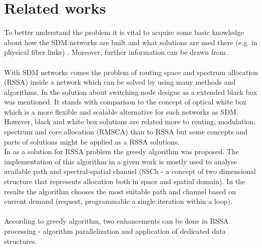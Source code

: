 \documentclass[conference]{IEEEtran}
\begin{document}
\section{Related works}
To better understand the problem it is vital to acquire some basic knowledge about how the SDM networks are built and what solutions are used there (e.g. in physical fiber links) \cite{sdm-intro}.
Moreover, further information can be drawn from \cite{rssa2}.
\\ \\
With SDM networks comes the problem of routing space and spectrum allocation (RSSA) inside a network which can be solved by using many methods and algorithms. In \cite{wb-box} the solution about  switching node designs as a extended black box was mentioned. It stands with comparison to the concept of optical white box which is a more flexible and scalable alternative for such networks as SDM. However, black and white box solutions are related more to routing, modulation, spectrum and core allocation (RMSCA) than to RSSA but some concepts and parts of solutions might be applied as a RSSA solutions.
\\
In \cite{sdm-walko} as a solution for RSSA problem the greedy algorithm was proposed. The implementation of this algorithm in a given work is mostly used to analyse available path and spectral-spatial channel (SSCh - a concept of two dimensional structure that represents allocation both in space and spatial domain). In the results the algorithm chooses the most suitable path and channel based on current demand (request, programmable a single iteration within a loop).
\\ \\
According to greedy algorithm, two enhancements can be done in RSSA processing - algorithm parallelization and application of dedicated
data structures\cite{rssa}.
\\
\end{document}
